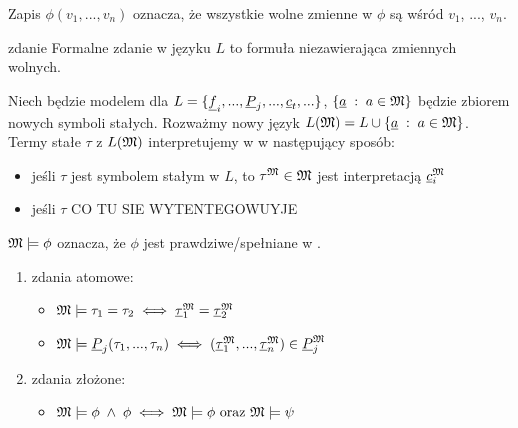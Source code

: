 Zapis $\phi(v_1,...,v_n)$ oznacza, że wszystkie wolne zmienne w $\phi$ są wśród $v_1$, ..., $v_n$.

\begin{definition}{zdanie}{}
  Formalne zdanie w języku $L$ to formuła niezawierająca zmiennych wolnych.
\end{definition}


Niech \Mm{} będzie modelem dla $L=\{\underline{f}_i,...,\underline{P}_j,...,\underline{c}_t,...\}$, $\{\underline{a}\;:\;a\in \mathfrak{M}\}$ będzie zbiorem nowych symboli stałych. Rozważmy nowy język $L(\mathfrak{M})=L\cup \{\underline{a}\;:\;a\in \mathfrak{M}\}$.
Termy stałe $\tau$ z $L(\mathfrak{M})$ interpretujemy w \Mm{} w następujący sposób:
\begin{itemize}
  \item jeśli $\tau$ jest symbolem stałym w $L$, to $\tau^{\mathfrak{M}}\in\mathfrak{M}$ jest interpretacją $\underline{c}_i^{\mathfrak{M}}$
  \item jeśli $\tau$ {\color{red}CO TU SIE WYTENTEGOWUYJE}
\end{itemize}

\begin{definition}{}{}
  $\mathfrak{M}\models\phi$ oznacza, że $\phi$ jest prawdziwe/spełniane w \Mm.
\end{definition}

\begin{enumerate}[label=\alph*)]
  \item zdania atomowe:
    \begin{itemize}
      \item $\mathfrak{M}\models \tau_1=\tau_2\iff\underline{\tau}_1^{\mathfrak{M}}=\underline{\tau}_2^{\mathfrak{M}}$
      \item $\mathfrak{M}\models \underline{P}_j(\tau_1,..., \tau_n)\iff (\underline{\tau}_1^{\mathfrak{M}},...,\underline{\tau}_n^{\mathfrak{M}})\in\underline{P}_j^{\mathfrak{M}}$
    \end{itemize}
  \item zdania złożone:
    \begin{itemize}
      \item $\mathfrak{M}\models\phi\;\land\;\phi\iff\mathfrak{M}\models\phi\text{ oraz }\mathfrak{M}\models\psi$
    \end{itemize}
\end{enumerate}




